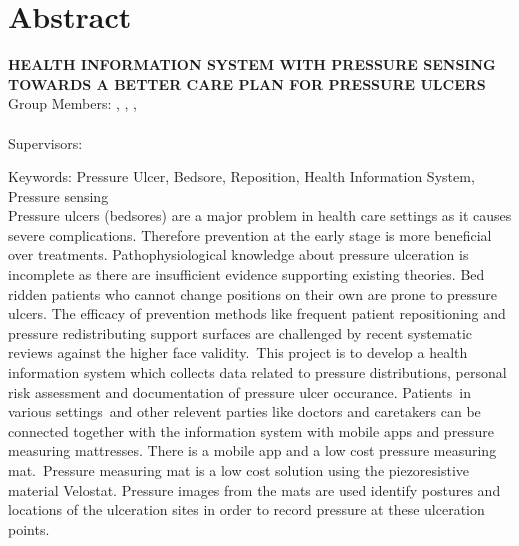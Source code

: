 \chapter*{Abstract}

\begin{center}
	\vspace{5mm}
	\MakeUppercase{\textbf{Health Information System with Pressure Sensing towards A Better Care Plan for Pressure Ulcers}}\\
	\vspace{5mm}
	Group Members: \memberA, \memberB, \memberC, \\ \memberD \\
	\vspace{5mm}
	Supervisors: \supervisorA %
	\vspace{5mm}
\end{center}

\noindent Keywords: Pressure Ulcer, Bedsore, Reposition, Health Information System, Pressure sensing\\


Pressure ulcers (bedsores) are a major problem in health care settings as it causes severe complications. Therefore prevention at the early stage is more beneficial over treatments. Pathophysiological knowledge about pressure ulceration is incomplete as there are insufficient evidence supporting existing theories. Bed ridden patients who cannot change positions on their own are prone to pressure ulcers. The efficacy of prevention methods like frequent patient repositioning and pressure redistributing support surfaces are challenged by recent systematic reviews against the higher face validity. This project is to develop a health information system which collects data related to pressure distributions, personal risk assessment and documentation of pressure ulcer occurance. Patients in various settings and other relevent parties like doctors and caretakers can be connected together with the information system with mobile apps and pressure measuring mattresses. There is a mobile app and a low cost pressure measuring mat. Pressure measuring mat is a low cost solution using the piezoresistive material Velostat. Pressure images from the mats are used identify postures and locations of the ulceration sites in order to record pressure at these ulceration points.
